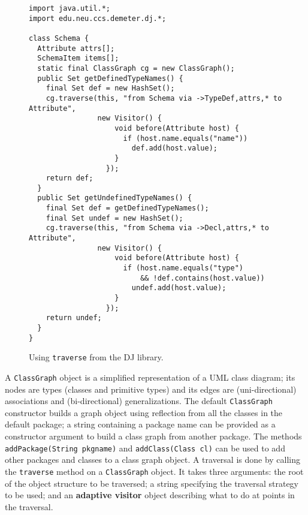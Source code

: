 \documentclass{llncs}
\newcommand{\defn}[1]{\textbf{#1}}
\newcommand{\code}[1]{\texttt{#1}}
\begin{document}
\begin{figure}[bp!]
\begin{minipage}{\textwidth}
\begin{verbatim}
import java.util.*;
import edu.neu.ccs.demeter.dj.*;

class Schema {
  Attribute attrs[];
  SchemaItem items[];
  static final ClassGraph cg = new ClassGraph();
  public Set getDefinedTypeNames() {
    final Set def = new HashSet();
    cg.traverse(this, "from Schema via ->TypeDef,attrs,* to Attribute",
                new Visitor() {
                    void before(Attribute host) {
                      if (host.name.equals("name"))
                        def.add(host.value);
                    }
                  });
    return def;
  }
  public Set getUndefinedTypeNames() {
    final Set def = getDefinedTypeNames();
    final Set undef = new HashSet();
    cg.traverse(this, "from Schema via ->Decl,attrs,* to Attribute",
                new Visitor() {
                    void before(Attribute host) {
                      if (host.name.equals("type")
                          && !def.contains(host.value))
                        undef.add(host.value);
                    }
                  });
    return undef;
  }
}
\end{verbatim}
\end{minipage}
\caption{Using \code{traverse} from the DJ library.}\label{fig:DJ}
\end{figure}

A \code{ClassGraph} object is a simplified representation of a UML
\cite{rational:UML-LUG} class diagram; its nodes are types (classes and
primitive types) and its edges are (uni-directional) associations and
(bi-directional) generalizations.
The default \code{ClassGraph} constructor builds a graph object using
reflection from all the classes in the default package; a string
containing a package name can be provided as a constructor argument to
build a class graph from another package.  The
methods \code{addPackage(String~pkgname)} and \code{addClass(Class~cl)}
can be used to add other packages and classes to a class graph
object.  A traversal is done by calling the \code{traverse} method on a
\code{ClassGraph} object.  It takes three arguments: the root of the
object structure to be traversed; a string specifying the traversal
strategy to be used; and an \defn{adaptive visitor} object
describing what to do at points in the traversal.
\end{document}
